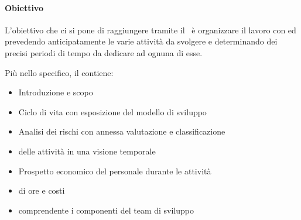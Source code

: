 			\paragraph{Obiettivo}
			L'obiettivo che ci si pone di raggiungere tramite il \PdP\ è organizzare il lavoro con  ed  prevedendo anticipatamente le varie attività da svolgere e determinando dei precisi periodi di tempo da dedicare ad ognuna di esse. \par
			Più nello specifico, il \Doc{\PdPv} contiene:
			\begin{itemize}
				\item Introduzione e scopo
				\item Ciclo di vita con esposizione del modello di sviluppo
				\item Analisi dei rischi con annessa valutazione e classificazione
				\item {} delle attività in una visione temporale
				\item Prospetto economico del personale durante le attività
				\item {} di ore e costi
				\item {} comprendente i componenti del team di sviluppo
			\end{itemize}

